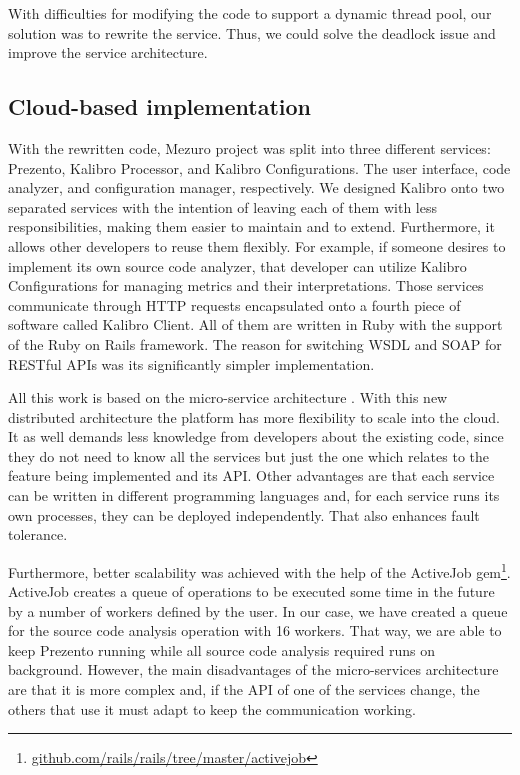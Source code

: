 With difficulties for modifying the code to support a dynamic thread pool, our
solution was to rewrite the service. Thus, we could solve the deadlock issue
and improve the service architecture.

\subsection{Cloud-based implementation}
\label{subsec:cloud-based-implementation}

With the rewritten code, Mezuro project was split into three different
services: Prezento, Kalibro Processor, and Kalibro Configurations. The user
interface, code analyzer, and configuration manager, respectively. We designed
Kalibro onto two separated services with the intention of leaving each of them
with less responsibilities, making them easier to maintain and to extend.
Furthermore, it allows other developers to reuse them flexibly. For example, if
someone desires to implement its own source code analyzer, that developer can
utilize Kalibro Configurations for managing metrics and their interpretations.
Those services communicate through HTTP requests encapsulated onto a fourth
piece of software called Kalibro Client.  All of them are written in Ruby with
the support of the Ruby on Rails framework. The reason for switching WSDL and
SOAP for RESTful APIs was its significantly simpler implementation.

All this work is based on the micro-service architecture
\cite{namiot2014micro}. With this new distributed architecture the platform has
more flexibility to scale into the cloud. It as well demands less knowledge
from developers about the existing code, since they do not need to know all the
services but just the one which relates to the feature being implemented and
its API. Other advantages are that each service can be written in different
programming languages and, for each service runs its own processes, they can be
deployed independently. That also enhances fault tolerance.

Furthermore, better scalability was achieved with the help of the ActiveJob
gem\footnote{\url{github.com/rails/rails/tree/master/activejob}}.  ActiveJob
creates a queue of operations to be executed some time in the future by a
number of workers defined by the user. In our case, we have created a queue for
the source code analysis operation with 16 workers. That way, we are able to
keep Prezento running while all source code analysis required runs on
background. However, the main disadvantages of the micro-services architecture
are that it is more complex and, if the API of one of the services change, the
others that use it must adapt to keep the communication working.

